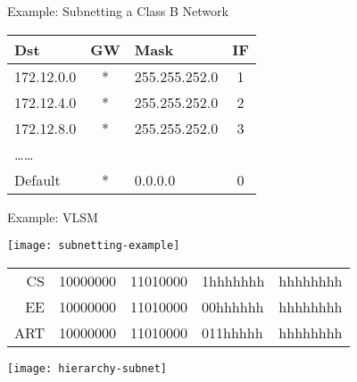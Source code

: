 \begin{frame}
  \begin{block}{Example: Subnetting a Class B Network}
    \begin{center}
    \end{center}
  \end{block}
  \begin{center}\ttfamily
    \begin{tabular}{lclc}
      \hline
      Dst&GW&Mask&IF\\\hline
      172.12.0.0&*&255.255.252.0&1\\
      172.12.4.0&*&255.255.252.0&2\\
      172.12.8.0&*&255.255.252.0&3\\
      \ldots\ldots&&&\\
      Default&*&0.0.0.0&0\\\hline
    \end{tabular}
  \end{center}
\end{frame}

\begin{frame}{Example: VLSM}
  \begin{minipage}{.5\linewidth}
    \texttt{[image: subnetting-example]}    \\[3ex]
    {\centering\small\ttfamily
      \begin{tabular}{r@{:~}l@{.}l@{.}l@{.}l}
        CS  & \alert{10000000} & \alert{11010000} & \alert{1}hhhhhhh & hhhhhhhh \\
        EE  & \alert{10000000} & \alert{11010000} & \alert{00}hhhhhh & hhhhhhhh \\
        ART & \alert{10000000} & \alert{11010000} & \alert{011}hhhhh & hhhhhhhh \\
      \end{tabular}
    }
  \end{minipage}\hfill
  \begin{minipage}{.5\linewidth}
    \texttt{[image: hierarchy-subnet]}
  \end{minipage}
\end{frame}

